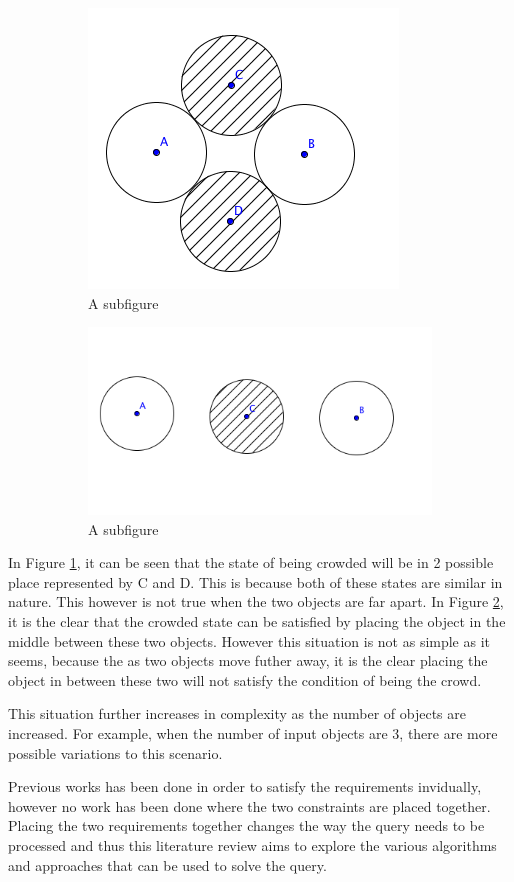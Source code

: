 \documentclass[a4paper,11pt]{article}
\begin{document}
\begin{figure}[h]
\centering
\begin{subfigure}{.4\textwidth}
  \centering
  \includegraphics[width=.4\linewidth]{2OOICloseSolution}
  \caption{A subfigure}
  \label{fig:2OOICloseSolution}
\end{subfigure}%
\begin{subfigure}{.4\textwidth}
  \centering
  \includegraphics[width=.4\linewidth]{2OOIFarSolution}
  \caption{A subfigure}
  \label{fig:2OOIFarSolution}
\end{subfigure}
\caption{}
\label{fig:Condition}
\end{figure}

In Figure \ref{fig:2OOICloseSolution}, it can be seen that the state of being crowded will be in 2 possible place represented by C and D. This is because both of these states are similar in nature. This however is not true when the two objects are far apart. In Figure \ref{fig:2OOIFarSolution}, it is the clear that the crowded state can be satisfied by placing the object in the middle between these two objects. However this situation is not as simple as it seems, because the as two objects move futher away, it is the clear placing the object in between these two will not satisfy the condition of being the crowd. 

This situation further increases in complexity as the number of objects are increased. For example, when the number of input objects are 3, there are more possible variations to this scenario. 


Previous works has been done in order to satisfy the requirements invidually,  however no work has been done where the two constraints are placed together. Placing the two requirements together changes the way the query needs to be processed and thus this literature review aims to explore the various algorithms and approaches that can be used to solve the query. 
\end{document}

